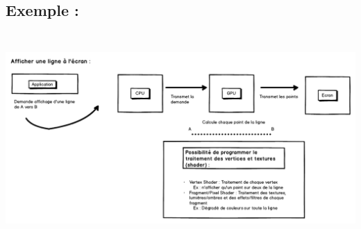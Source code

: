 \subsection{Exemple :}
\begin{center}
\includegraphics[width=15cm,height=8cm]{img/gpuRasterExemple.png}
\end{center}


